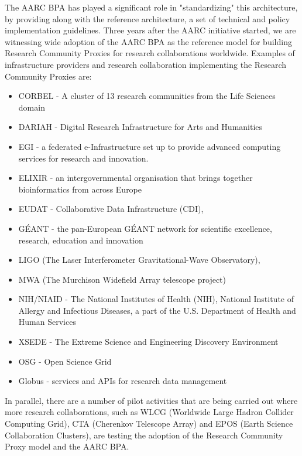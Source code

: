 \documentclass[fleqn,10pt]{wlscirep}
\begin{document}
{The AARC BPA has played a significant role in "standardizing" this architecture, by providing along with the reference architecture, a set of technical and policy implementation guidelines\cite{aarcguidelines}. Three years after the AARC initiative started, we are witnessing wide adoption of the AARC BPA as the reference model for building Research Community Proxies for research collaborations worldwide. Examples of infrastructure providers and research collaboration implementing the Research Community Proxies are:
\begin{itemize}
  \item CORBEL - A cluster of 13 research communities from the Life Sciences domain
  \item   DARIAH - Digital Research Infrastructure for Arts and Humanities
  \item EGI - a federated e-Infrastructure set up to provide advanced computing services for research and innovation.
  \item ELIXIR - an intergovernmental organisation that brings together bioinformatics from across Europe
  \item EUDAT -  Collaborative Data Infrastructure (CDI),
  \item GÉANT - the pan-European GÉANT network for scientific excellence, research, education and innovation
  \item LIGO (The Laser Interferometer Gravitational-Wave Observatory),
  \item MWA (The Murchison Widefield Array telescope project)
  \item NIH/NIAID - The National Institutes of Health (NIH), National Institute of Allergy and Infectious Diseases, a part of the U.S. Department of Health and Human Services
  \item XSEDE - The Extreme Science and Engineering Discovery Environment
  \item OSG - Open Science Grid
  \item Globus - services and APIs for research data management
\end{itemize}
In parallel, there are a number of pilot activities that are being carried out where more research collaborations, such as WLCG (Worldwide Large Hadron Collider Computing Grid), CTA (Cherenkov Telescope Array)  and EPOS (Earth Science Collaboration Clusters), are testing the adoption of the Research Community Proxy model and the AARC BPA. 

}
\end{document}
